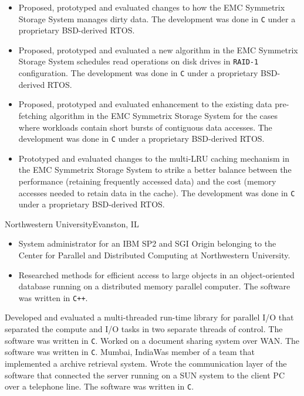 {
	\begin{itemize}
		\item Proposed, prototyped and evaluated changes to how the EMC Symmetrix Storage System manages dirty data.
			The development was done in \texttt{C} under a proprietary BSD-derived RTOS.
		\item Proposed, prototyped and evaluated a new algorithm in the EMC Symmetrix Storage System schedules read
			operations on disk drives in \texttt{RAID-1} configuration.
			The development was done in \texttt{C} under a proprietary BSD-derived RTOS.
		\item Proposed, prototyped and evaluated enhancement to the existing data pre-fetching algorithm
			in the EMC Symmetrix Storage System for the cases where workloads contain short bursts of 
			contiguous data accesses. The development was done in \texttt{C} under a proprietary BSD-derived RTOS.
		\item Prototyped and evaluated changes to the multi-LRU caching mechanism in the EMC Symmetrix Storage
			System to strike a better balance between the performance (retaining frequently accessed data) and the cost
			(memory accesses needed to retain data in the cache).
			The development was done in \texttt{C} under a proprietary BSD-derived RTOS.
	\end{itemize}
}
{Northwestern University}{Evanston, IL}
{\begin{itemize}
	\item System administrator for an IBM SP2 and SGI Origin belonging to the 
		Center for Parallel and Distributed Computing at Northwestern University.
	\item Researched methods for efficient access to large objects in an object-oriented
		database running on a distributed memory parallel computer. The
		software was written in \texttt{C++}.
	\end{itemize}}
{Developed and evaluated a multi-threaded run-time library for parallel I/O that
separated the compute and I/O tasks in two separate threads of control. The
software was written in \texttt{C}.}
{Worked on a document sharing system over WAN. The software was written in \texttt{C}.}
{Mumbai, India}{}{Was member of a team that implemented a archive retrieval system.
Wrote the communication layer of the software that connected the server running
on a SUN system to the client PC over a telephone line. The software was
written in \texttt{C}.}

